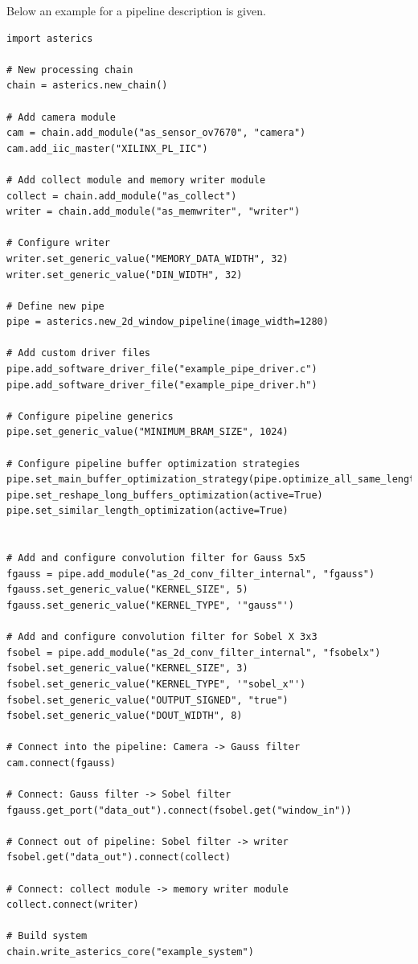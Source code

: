 Below an example for a pipeline description is given.

\begin{lstlisting}[style=AutomaticsPython, label={lst:06-02-2dpipe_script}, caption=Example definition of a small 2D Window Pipeline using Automatics]
import asterics

# New processing chain
chain = asterics.new_chain()

# Add camera module
cam = chain.add_module("as_sensor_ov7670", "camera")
cam.add_iic_master("XILINX_PL_IIC")

# Add collect module and memory writer module
collect = chain.add_module("as_collect")
writer = chain.add_module("as_memwriter", "writer")

# Configure writer
writer.set_generic_value("MEMORY_DATA_WIDTH", 32)
writer.set_generic_value("DIN_WIDTH", 32)

# Define new pipe
pipe = asterics.new_2d_window_pipeline(image_width=1280)

# Add custom driver files
pipe.add_software_driver_file("example_pipe_driver.c")
pipe.add_software_driver_file("example_pipe_driver.h")

# Configure pipeline generics
pipe.set_generic_value("MINIMUM_BRAM_SIZE", 1024)

# Configure pipeline buffer optimization strategies
pipe.set_main_buffer_optimization_strategy(pipe.optimize_all_same_length)
pipe.set_reshape_long_buffers_optimization(active=True)
pipe.set_similar_length_optimization(active=True)


# Add and configure convolution filter for Gauss 5x5
fgauss = pipe.add_module("as_2d_conv_filter_internal", "fgauss")
fgauss.set_generic_value("KERNEL_SIZE", 5)
fgauss.set_generic_value("KERNEL_TYPE", '"gauss"')

# Add and configure convolution filter for Sobel X 3x3
fsobel = pipe.add_module("as_2d_conv_filter_internal", "fsobelx")
fsobel.set_generic_value("KERNEL_SIZE", 3)
fsobel.set_generic_value("KERNEL_TYPE", '"sobel_x"')
fsobel.set_generic_value("OUTPUT_SIGNED", "true")
fsobel.set_generic_value("DOUT_WIDTH", 8)

# Connect into the pipeline: Camera -> Gauss filter
cam.connect(fgauss)

# Connect: Gauss filter -> Sobel filter
fgauss.get_port("data_out").connect(fsobel.get("window_in"))

# Connect out of pipeline: Sobel filter -> writer
fsobel.get("data_out").connect(collect)

# Connect: collect module -> memory writer module
collect.connect(writer)

# Build system
chain.write_asterics_core("example_system")
\end{lstlisting}

